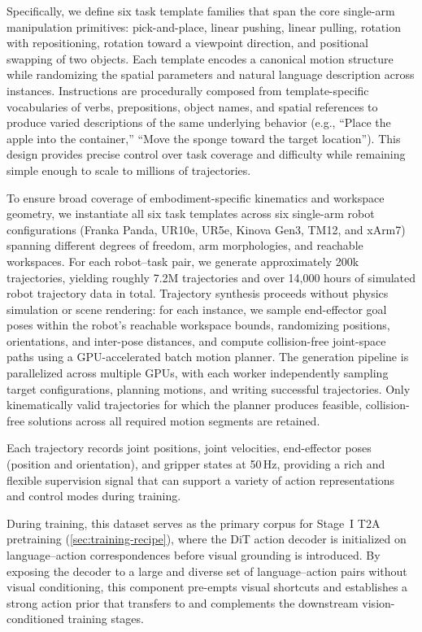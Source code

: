 \documentclass{llmxive}
\begin{document}
Specifically, we define six task template families that span the core single-arm manipulation primitives: pick-and-place, linear pushing, linear pulling, rotation with repositioning, rotation toward a viewpoint direction, and positional swapping of two objects. Each template encodes a canonical motion structure while randomizing the spatial parameters and natural language description across instances. Instructions are procedurally composed from template-specific vocabularies of verbs, prepositions, object names, and spatial references to produce varied descriptions of the same underlying behavior (e.g., ``Place the apple into the container,'' ``Move the sponge toward the target location''). This design provides precise control over task coverage and difficulty while remaining simple enough to scale to millions of trajectories.

To ensure broad coverage of embodiment-specific kinematics and workspace geometry, we instantiate all six task templates across six single-arm robot configurations (Franka Panda, UR10e, UR5e, Kinova Gen3, TM12, and xArm7) spanning different degrees of freedom, arm morphologies, and reachable workspaces. For each robot--task pair, we generate approximately 200k trajectories, yielding roughly 7.2M trajectories and over 14,000 hours of simulated robot trajectory data in total. Trajectory synthesis proceeds without physics simulation or scene rendering: for each instance, we sample end-effector goal poses within the robot's reachable workspace bounds, randomizing positions, orientations, and inter-pose distances, and compute collision-free joint-space paths using a GPU-accelerated batch motion planner. The generation pipeline is parallelized across multiple GPUs, with each worker independently sampling target configurations, planning motions, and writing successful trajectories. Only kinematically valid trajectories for which the planner produces feasible, collision-free solutions across all required motion segments are retained.

Each trajectory records joint positions, joint velocities, end-effector poses (position and orientation), and gripper states at 50\,Hz, providing a rich and flexible supervision signal that can support a variety of action representations and control modes during training.

During training, this dataset serves as the primary corpus for Stage~I T2A pretraining (\cref{sec:training-recipe}), where the DiT action decoder is initialized on language--action correspondences before visual grounding is introduced. By exposing the decoder to a large and diverse set of language--action pairs without visual conditioning, this component pre-empts visual shortcuts and establishes a strong action prior that transfers to and complements the downstream vision-conditioned training stages.
\end{document}
